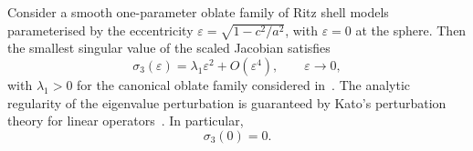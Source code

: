 \begin{proposition}
\label{prop:p10_asymptotics}
Consider a smooth one-parameter oblate family of Ritz shell models
parameterised by the eccentricity
$\varepsilon=\sqrt{1-c^2/a^2}$,
with $\varepsilon=0$ at the sphere.  Then the
smallest singular value of the scaled Jacobian satisfies
\begin{equation}
  \sigma_3(\varepsilon)
  =
  \lambda_1 \varepsilon^2 + O(\varepsilon^4),
  \qquad \varepsilon \to 0,
  \label{eq:p10_sigma_asymptotic}
\end{equation}
with $\lambda_1>0$ for the canonical oblate family considered
in~\cite{BrowntoneP8,BrowntoneP9}.  The analytic regularity of the eigenvalue
perturbation is guaranteed by Kato's perturbation theory for linear
operators~\cite{Kato1966}.  In
particular,
\begin{equation}
  \sigma_3(0)=0.
\end{equation}
\end{proposition}

